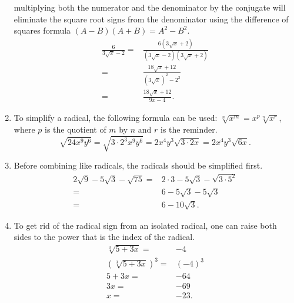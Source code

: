 \documentclass[
  12pt]{article}
\begin{document}
\begin{enumerate}
  multiplying both the numerator and the denominator by the conjugate
  will eliminate the square root signs from the denominator using the
  difference of squares formula \((A-B)(A+B)=A^2-B^2\). \[
  \begin{aligned}
  \frac{6}{3\sqrt{x}-2}=&\frac{6(3\sqrt{x}+2)}{(3\sqrt{x}-2)(3\sqrt{x}+2)}\\
  =&\frac{18\sqrt{x}+12}{(3\sqrt{x})^2-2^2}\\
  =&\frac{18\sqrt{x}+12}{9x-4}.
  \end{aligned}
  \]
\item
  To simplify a radical, the following formula can be used:
  \(\sqrt[n]{x^m}=x^p\sqrt[n]{x^r}\), where \(p\) is the quotient of
  \(m\) by \(n\) and \(r\) is the reminder.
  \[\sqrt{24x^9y^6}=\sqrt{3\cdot 2^3x^9y^6}=2x^4y^3\sqrt{3\cdot 2 x}=2x^4y^3\sqrt{6x}.\]
\item
  Before combining like radicals, the radicals should be simplified
  first. \[
  \begin{aligned}
  2\sqrt{9}-5\sqrt3-\sqrt{75}=&2\cdot 3-5\sqrt3-\sqrt{3\cdot 5^2}\\
  =&6-5\sqrt3-5\sqrt3\\
  =&6-10\sqrt3.
  \end{aligned}
  \]
\item
  To get rid of the radical sign from an isolated radical, one can raise
  both sides to the power that is the index of the radical. \[
  \begin{aligned}
  \sqrt[3]{5+3x}=&-4\\
  (\sqrt[3]{5+3x})^3=&(-4)^3\\
  5+3x=&-64\\
  3x=&-69\\
  x=&-23.
  \end{aligned}
  \]


\end{enumerate}
\end{document}
